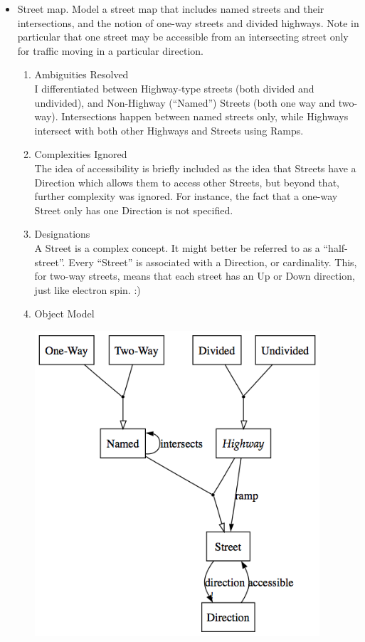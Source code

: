 \documentclass[11pt,letterpaper]{article}
\begin{document}
\begin{itemize}
\item Street map. Model a street map that includes named streets and their intersections, and the notion of one-way streets and divided highways. Note in particular that one street may be accessible from an intersecting street only for traffic moving in a particular direction.

\begin{enumerate}
\item Ambiguities Resolved\\
I differentiated between Highway-type streets (both divided and undivided), and Non-Highway (``Named'') Streets (both one way and two-way). Intersections happen between named streets only, while Highways intersect with both other Highways and Streets using Ramps.
\item Complexities Ignored\\
The idea of accessibility is briefly included as the idea that Streets have a Direction which allows them to access other Streets, but beyond that, further complexity was ignored. For instance, the fact that a one-way Street only has one Direction is not specified.
\item Designations\\
A Street is a complex concept. It might better be referred to as a ``half-street''. Every ``Street'' is associated with a Direction, or cardinality. This, for two-way streets, means that each street has an Up or Down direction, just like electron spin. :)

\item Object Model\\
\begin{center}
\includegraphics[width=300pt]{dot/b2.png}
\label{fig:ob2} 
\end{center}
\end{enumerate}


\end{itemize}
\end{document}
